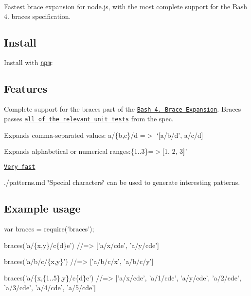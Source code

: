 Fastest brace expansion for node.\+js, with the most complete support for the Bash 4. braces specification.

\subsection*{Install}

Install with \href{https://www.npmjs.com/}{\tt npm}\+:




\subsection*{Features}


\begin{DoxyItemize}
\item Complete support for the braces part of the \href{www.gnu.org/software/bash/}{\tt Bash 4. Brace Expansion}. Braces passes \href{#bash-4-3-support}{\tt all of the relevant unit tests} from the spec.
\item Expands comma-\/separated values\+: {\ttfamily a/\{b,c\}/d} =$>$ `\mbox{[}\textquotesingle{}a/b/d', \textquotesingle{}a/c/d\textquotesingle{}\mbox{]}{\ttfamily }
\item {\ttfamily Expands alphabetical or numerical ranges\+:}\{1..3\}{\ttfamily =$>$}\mbox{[}\textquotesingle{}1\textquotesingle{}, \textquotesingle{}2\textquotesingle{}, \textquotesingle{}3\textquotesingle{}\mbox{]}\`{}
\item \href{#benchmarks}{\tt Very fast}
\item ./patterns.md \char`\"{}\+Special characters\char`\"{} can be used to generate interesting patterns.
\end{DoxyItemize}

\subsection*{Example usage}


\begin{DoxyCode}
var braces = require('braces');

braces('a/\{x,y\}/c\{d\}e')
//=> ['a/x/cde', 'a/y/cde']

braces('a/b/c/\{x,y\}')
//=> ['a/b/c/x', 'a/b/c/y']

braces('a/\{x,\{1..5\},y\}/c\{d\}e')
//=> ['a/x/cde', 'a/1/cde', 'a/y/cde', 'a/2/cde', 'a/3/cde', 'a/4/cde', 'a/5/cde']
\end{DoxyCode}


